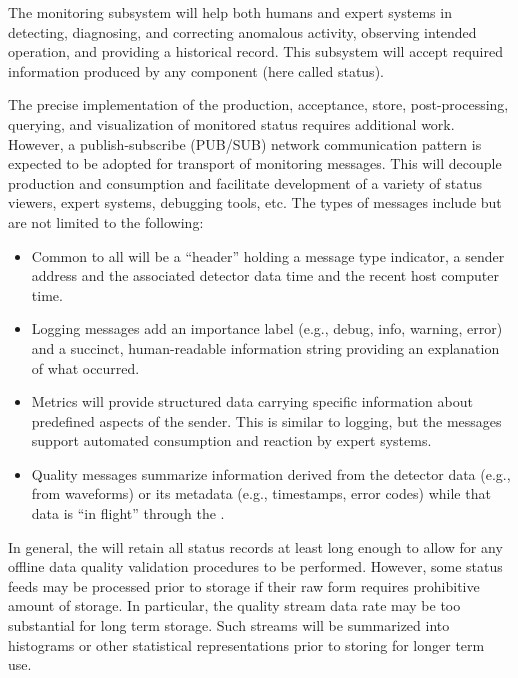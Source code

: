 The  monitoring subsystem will help both humans and expert systems in detecting, diagnosing, and correcting anomalous activity, observing intended operation, and providing a historical record.
This subsystem will accept required information produced by any  component (here called status).

The precise implementation of the production, acceptance, store, post-processing, querying, and visualization of monitored status requires additional work. 
However, a publish-subscribe (PUB/SUB) network communication pattern is expected to be adopted for transport of monitoring messages. 
This will decouple production and consumption and facilitate development of a variety of status viewers, expert systems, debugging tools, etc. 
The types of messages include but are not limited to the following:

\begin{itemize}
\item Common to all will be a ``header'' holding a message type indicator, a sender address and the associated detector data time and the recent host computer time.
 
\item Logging messages add an importance label (e.g., debug, info, warning, error) and a succinct, human-readable information string providing an explanation of what occurred.
  
\item Metrics will provide structured data carrying specific information about predefined aspects of the sender. 
  This is similar to logging, but the messages support automated consumption and reaction by expert systems.  

\item Quality messages summarize information derived from the detector data (e.g., from waveforms) or its metadata (e.g., timestamps, error codes) while that data is ``in flight'' through the .

\end{itemize}

In general, the  will retain all status records at least long enough to allow for any offline data quality validation procedures to be performed. 
However, some status feeds may be processed prior to storage if their raw form requires prohibitive amount of storage. 
In particular, the quality stream data rate may be too substantial for long term storage. 
Such streams will be summarized into histograms or other statistical representations prior to storing for longer term use.

